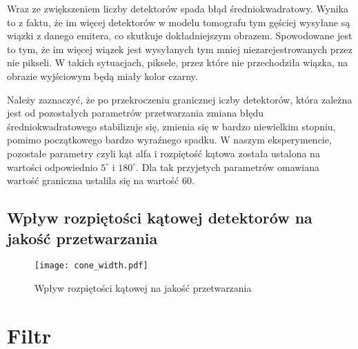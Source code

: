 \documentclass{article}
\begin{document}
Wraz ze zwiększeniem liczby detektorów spada błąd średniokwadratowy. Wynika to z faktu, że im więcej detektorów w modelu tomografu tym gęściej wysyłane są wiązki z danego emitera, co skutkuje dokładniejszym obrazem. Spowodowane jest to tym, że im więcej wiązek jest wysyłanych tym mniej niezarejestrowanych przez nie pikseli. W takich sytuacjach, piksele, przez które nie przechodziła wiązka, na obrazie wyjściowym będą miały kolor czarny.

Należy zaznaczyć, że po przekroczeniu granicznej iczby detektorów, która zależna jest od pozostałych parametrów przetwarzania zmiana błędu średniokwadratowego stabilizuje się, zmienia się w bardzo niewielkim stopniu, pomimo początkowego bardzo wyraźnego spadku.
W naszym eksperymencie, pozostałe parametry czyli kąt alfa i rozpiętość kątowa została ustalona na wartości odpowiednio $5 ^{\circ}$ i $180 ^{\circ}$. Dla tak przyjetych parametrów omawiana wartość graniczna ustalila się na wartość 60. 

\subsection{Wpływ rozpiętości kątowej detektorów na jakość przetwarzania}
\label{subsec_cone_width_comparison}


\begin{figure}[!htbp]
\begin{center}
\texttt{[image: cone\_width.pdf]}
\end{center}
\caption{Wpływ rozpiętości kątowej na jakość przetwarzania}
\label{fig:cone_width}
\end{figure}

\section{Filtr}




\end{document}
